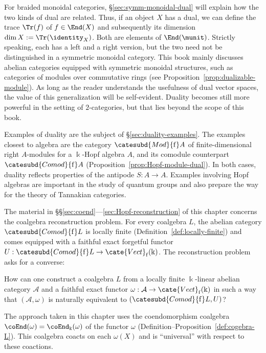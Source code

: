 For braided monoidal categories, \S\ref{sec:symm-monoidal-dual} will explain
how the two kinds of dual are related. Thus, if an object $X$ has a dual, we
can define the trace $\Tr(f)$ of $f\in\End(X)$ and subsequently its dimension
$\dim X:=\Tr(\identity_X)$. Both are elements of $\End(\munit)$. Strictly
speaking, each has a left and a right version, but the two need not be
distinguished in a symmetric monoidal category. This book mainly discusses
abelian categories equipped with symmetric monoidal structures, such as
categories of modules over commutative rings (see
Proposition~\ref{prop:dualizable-module}). As long as the reader understands
the usefulness of dual vector spaces, the value of this generalization will
be self-evident. Duality becomes still more powerful in the setting of
$2$-categories, but that lies beyond the scope of this book.

Examples of duality are the subject of \S\ref{sec:duality-examples}. The
examples closest to algebra are the category
$\catesubd{Mod}{\mathrm{f}}A$ of finite-dimensional right $A$-modules for a
$\Bbbk$-Hopf algebra $A$, and its comodule counterpart
$\catesubd{Comod}{\mathrm{f}}A$ (Proposition~\ref{prop:Hopf-module-dual}).
In both cases, duality reflects properties of the antipode $S:A\to A$.
Examples involving Hopf algebras are important in the study of quantum
groups and also prepare the way for the theory of Tannakian categories.

The material in \S\S\ref{sec:coend}---\ref{sec:Hopf-reconstruction} of this
chapter concerns the coalgebra reconstruction problem. For every coalgebra
$L$, the abelian category $\catesubd{Comod}{\mathrm{f}}L$ is locally finite
(Definition~\ref{def:locally-finite}) and comes equipped with a faithful
exact forgetful functor
$U:\catesubd{Comod}{\mathrm{f}}L\to\cate{Vect}_{\mathrm{f}}(\Bbbk)$.
The reconstruction problem asks for a converse:
\begin{center}\begin{minipage}{0.8\textwidth}
	How can one construct a coalgebra $L$ from a locally finite
	$\Bbbk$-linear abelian category $\mathcal{A}$ and a faithful exact functor
	$\omega:\mathcal{A}\to\cate{Vect}_{\mathrm{f}}(\Bbbk)$ in such a way
	that $(\mathcal{A},\omega)$ is naturally equivalent to
	$(\catesubd{Comod}{\mathrm{f}}L,U)$?
\end{minipage}\end{center}
The approach taken in this chapter uses the coendomorphism coalgebra
$\coEnd(\omega)=\coEnd_{\Bbbk}(\omega)$ of the functor $\omega$
(Definition--Proposition~\ref{def:cogebra-L}). This coalgebra coacts on each
$\omega(X)$ and is ``universal'' with respect to these coactions.

